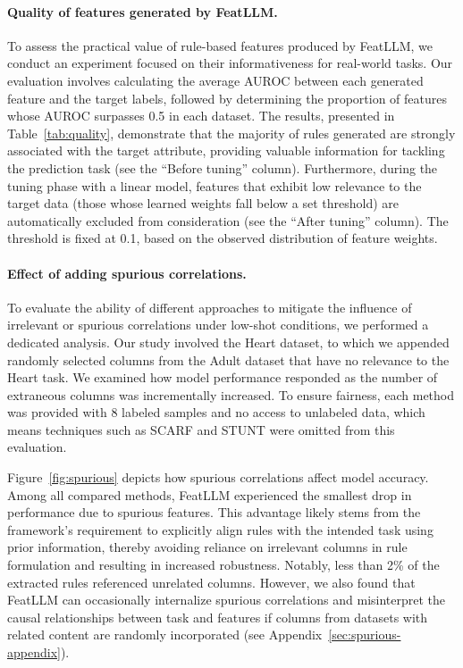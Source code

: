 \vspace*{-0.12in}
\paragraph{Quality of features generated by \textsf{FeatLLM}.}
To assess the practical value of rule-based features produced by \textsf{FeatLLM}, we conduct an experiment focused on their informativeness for real-world tasks. Our evaluation involves calculating the average AUROC between each generated feature and the target labels, followed by determining the proportion of features whose AUROC surpasses 0.5 in each dataset. The results, presented in Table~\ref{tab:quality}, demonstrate that the majority of rules generated are strongly associated with the target attribute, providing valuable information for tackling the prediction task (see the ``Before tuning'' column). Furthermore, during the tuning phase with a linear model, features that exhibit low relevance to the target data (those whose learned weights fall below a set threshold) are automatically excluded from consideration (see the ``After tuning'' column). The threshold is fixed at 0.1, based on the observed distribution of feature weights.

\vspace*{-0.12in}
\paragraph{Effect of adding spurious correlations.} To evaluate the ability of different approaches to mitigate the influence of irrelevant or spurious correlations under low-shot conditions, we performed a dedicated analysis. Our study involved the Heart dataset, to which we appended randomly selected columns from the Adult dataset that have no relevance to the Heart task. We examined how model performance responded as the number of extraneous columns was incrementally increased. To ensure fairness, each method was provided with 8 labeled samples and no access to unlabeled data, which means techniques such as SCARF and STUNT were omitted from this evaluation.

Figure~\ref{fig:spurious} depicts how spurious correlations affect model accuracy. Among all compared methods, \textsf{FeatLLM} experienced the smallest drop in performance due to spurious features. This advantage likely stems from the framework’s requirement to explicitly align rules with the intended task using prior information, thereby avoiding reliance on irrelevant columns in rule formulation and resulting in increased robustness. Notably, less than 2\% of the extracted rules referenced unrelated columns. However, we also found that \textsf{FeatLLM} can occasionally internalize spurious correlations and misinterpret the causal relationships between task and features if columns from datasets with related content are randomly incorporated (see Appendix~\ref{sec:spurious-appendix}).

